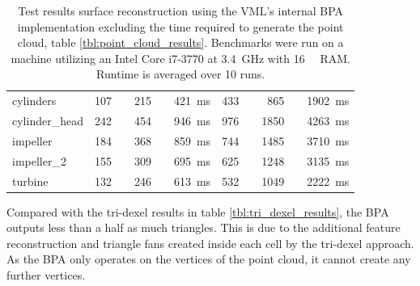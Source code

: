 \begin{table}
\begin{tabular}{l|rrr|rrr}
		cylinders      & \SI{107}{\kilo\nothing}& \SI{215}{\kilo\nothing} & \SI{ 421}{\milli\second} & \SI{433}{\kilo\nothing}& \SI{ 865}{\kilo\nothing} & \SI{1902}{\milli\second} \\
		cylinder\_head & \SI{242}{\kilo\nothing}& \SI{454}{\kilo\nothing} & \SI{ 946}{\milli\second} & \SI{976}{\kilo\nothing}& \SI{1850}{\kilo\nothing} & \SI{4263}{\milli\second} \\
		impeller       & \SI{184}{\kilo\nothing}& \SI{368}{\kilo\nothing} & \SI{ 859}{\milli\second} & \SI{744}{\kilo\nothing}& \SI{1485}{\kilo\nothing} & \SI{3710}{\milli\second} \\
		impeller\_2    & \SI{155}{\kilo\nothing}& \SI{309}{\kilo\nothing} & \SI{ 695}{\milli\second} & \SI{625}{\kilo\nothing}& \SI{1248}{\kilo\nothing} & \SI{3135}{\milli\second} \\
		turbine        & \SI{132}{\kilo\nothing}& \SI{246}{\kilo\nothing} & \SI{ 613}{\milli\second} & \SI{532}{\kilo\nothing}& \SI{1049}{\kilo\nothing} & \SI{2222}{\milli\second} \\
	\end{tabular}
	\caption{
		Test results surface reconstruction using the VML's internal BPA implementation excluding the time required to generate the point cloud, \cf table \ref{tbl:point_cloud_results}.
		Benchmarks were run on a machine utilizing an Intel Core i7-3770 at \SI{3.4}{\giga\hertz} with \SI{16}{\gibi\byte} RAM.
		Runtime is averaged over 10 runs.
	}
	\label{tbl:bpa_results}
\end{table}
%
Compared with the tri-dexel results in table \ref{tbl:tri_dexel_results}, the BPA outputs less than a half as much triangles.
This is due to the additional feature reconstruction and triangle fans created inside each cell by the tri-dexel approach.
As the BPA only operates on the vertices of the point cloud, it cannot create any further vertices.

